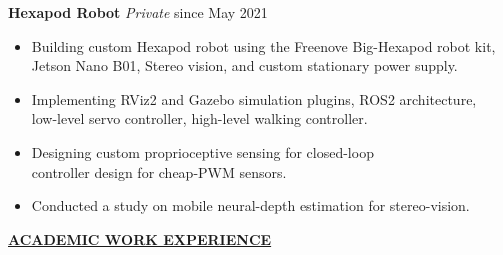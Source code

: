 \documentclass{article}
\begin{document}
\noindent \textbf{Hexapod Robot} \textit{Private} \hfill since May 2021
\begin{itemize}[noitemsep,nolistsep,leftmargin=*]
    \item Building custom Hexapod robot using the Freenove Big-Hexapod robot kit, \\
    Jetson Nano B01, Stereo vision, and custom stationary power supply. 
    \item Implementing RViz2 and Gazebo simulation plugins, ROS2 architecture, \\
    low-level servo controller, high-level walking controller. 
    \item Designing custom proprioceptive sensing for closed-loop \\
    controller design for cheap-PWM sensors.
    \item Conducted a study on mobile neural-depth estimation for stereo-vision. \\
\end{itemize}

% 
%
\noindent \textbf{\underline{ACADEMIC WORK EXPERIENCE}} \\

\end{document}
